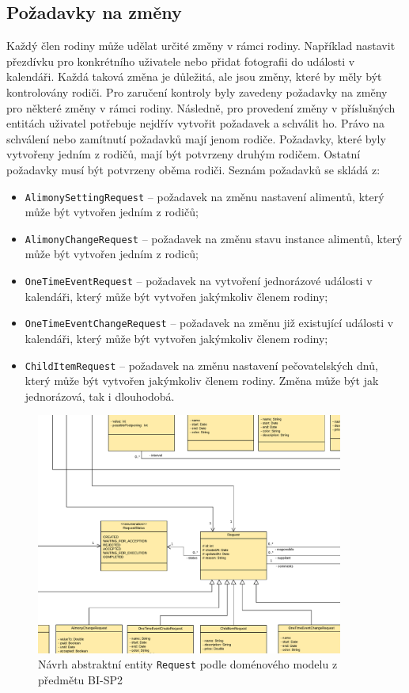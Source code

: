     \subsection{Požadavky na změny}
        Každý člen rodiny může udělat určité změny v rámci rodiny. Například nastavit přezdívku pro konkrétního uživatele nebo přidat fotografii do události v kalendáři. Každá taková změna je důležitá, ale jsou změny, které by měly být kontrolovány rodiči. Pro zaručení kontroly byly zavedeny požadavky na změny pro některé změny v rámci rodiny. Následně, pro provedení změny v příslušných entitách uživatel potřebuje nejdřív vytvořit požadavek a schválit ho.
        Právo na schválení nebo zamítnutí požadavků mají jenom rodiče. Požadavky, které byly vytvořeny jedním z rodičů, mají být potvrzeny druhým rodičem. Ostatní požadavky musí být potvrzeny oběma rodiči. Seznám požadavků se skládá z:
        \begin{itemize}
            \item \texttt{AlimonySettingRequest} -- požadavek na změnu nastavení alimentů, který může být vytvořen jedním z rodičů;
            \item \texttt{AlimonyChangeRequest} -- požadavek na změnu stavu instance alimentů, který může být vytvořen jedním z rodiců;
            \item \texttt{OneTimeEventRequest} -- požadavek na vytvoření jednorázové události v kalendáři, který může být vytvořen jakýmkoliv členem rodiny;
            \item \texttt{OneTimeEventChangeRequest} -- požadavek na změnu již existující události v kalendáři, který může být vytvořen jakýmkoliv členem rodiny;
            \item \texttt{ChildItemRequest} -- požadavek na změnu nastavení pečovatelských dnů, který může být vytvořen jakýmkoliv členem rodiny. Změna může být jak jednorázová, tak i dlouhodobá.
        \end{itemize}
        \begin{figure}\centering
	        \includegraphics[width=0.9\textwidth]{pdfs/Abstr-Requrest1}
	        \caption[Návrh abstraktní entity \texttt{Request}]{Návrh abstraktní entity \texttt{Request} podle doménového modelu z předmětu BI-SP2}\label{image:abstr-request1}
        \end{figure}

